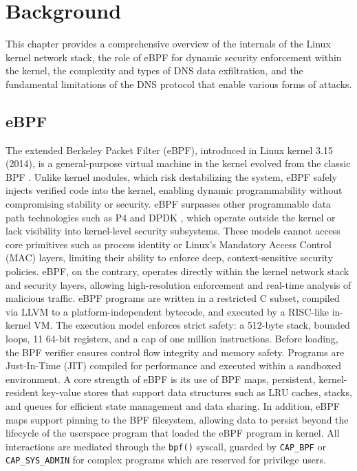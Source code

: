 \documentclass [11pt, proquest] {uwthesis}[2020/02/24]
\begin{document}
\chapter {Background}
This chapter provides a comprehensive overview of the internals of the Linux kernel network stack, the role of eBPF for dynamic security enforcement within the kernel, the complexity and types of DNS data exfiltration, and the fundamental limitations of the DNS protocol that enable various forms of attacks.

\section{eBPF}
The extended Berkeley Packet Filter (eBPF), introduced in Linux kernel 3.15 (2014), is a general-purpose virtual machine in the kernel evolved from the classic BPF \cite{10.5555/1267303.1267305}. Unlike kernel modules, which risk destabilizing the system, eBPF safely injects verified code into the kernel, enabling dynamic programmability without compromising stability or security. eBPF surpasses other programmable data path technologies such as P4 \cite{bosshart2014p4} and DPDK \cite{8701793}, which operate outside the kernel or lack visibility into kernel-level security subsystems. These models cannot access core primitives such as process identity or Linux’s Mandatory Access Control (MAC) layers, limiting their ability to enforce deep, context-sensitive security policies. eBPF, on the contrary, operates directly within the kernel network stack and security layers, allowing high-resolution enforcement and real-time analysis of malicious traffic. eBPF programs are written in a restricted C subset, compiled via LLVM to a platform-independent bytecode, and executed by a RISC-like in-kernel VM. The execution model enforces strict safety: a 512-byte stack, bounded loops, 11 64-bit registers, and a cap of one million instructions. Before loading, the BPF verifier ensures control flow integrity and memory safety. Programs are Just-In-Time (JIT) compiled for performance and executed within a sandboxed environment. A core strength of eBPF is its use of BPF maps, persistent, kernel-resident key-value stores that support data structures such as LRU caches, stacks, and queues for efficient state management and data sharing. In addition, eBPF maps support pinning to the BPF filesystem, allowing data to persist beyond the lifecycle of the userspace program that loaded the eBPF program in kernel. All interactions are mediated through the \texttt{bpf()} syscall, guarded by \texttt{CAP\_BPF} or \texttt{CAP\_SYS\_ADMIN} for complex programs which are reserved for privilege users.
\end{document}
